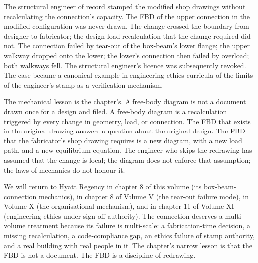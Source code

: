 The structural engineer of record stamped the modified shop drawings
without recalculating the connection's capacity. The FBD of the upper
connection in the modified configuration was never drawn. The change
crossed the boundary from designer to fabricator; the design-load
recalculation that the change required did not. The connection failed
by tear-out of the box-beam's lower flange; the upper walkway dropped
onto the lower; the lower's connection then failed by overload; both
walkways fell. The structural engineer's licence was subsequently
revoked. The case became a canonical example in engineering ethics
curricula of the limits of the engineer's stamp as a verification
mechanism.

The mechanical lesson is the chapter's. A free-body diagram is not a
document drawn once for a design and filed. A free-body diagram is a
recalculation triggered by every change in geometry, load, or
connection. The FBD that exists in the original drawing answers a
question about the original design. The FBD that the fabricator's
shop drawing requires is a new diagram, with a new load path, and a
new equilibrium equation. The engineer who skips the redrawing has
assumed that the change is local; the diagram does not enforce that
assumption; the laws of mechanics do not honour it.

We will return to Hyatt Regency in chapter 8 of this volume (its
box-beam-connection mechanics), in chapter 8 of Volume V (the
tear-out failure mode), in Volume X (the organisational mechanism),
and in chapter 11 of Volume XI (engineering ethics under sign-off
authority). The connection deserves a multi-volume treatment because
its failure is multi-scale: a fabrication-time decision, a missing
recalculation, a code-compliance gap, an ethics failure of stamp
authority, and a real building with real people in it. The chapter's
narrow lesson is that the FBD is not a document. The FBD is a
discipline of redrawing.

